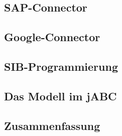 




\subsection{SAP-Connector}


\subsection{Google-Connector}




\subsection{SIB-Programmierung}


\subsection{Das Modell im jABC}




\subsection{Zusammenfassung}






